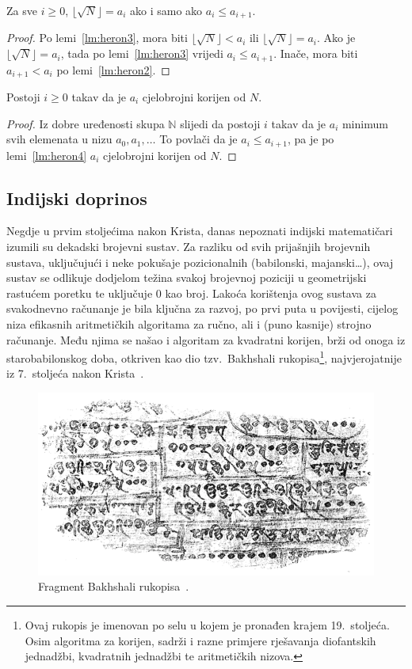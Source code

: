\documentclass[12pt]{scrartcl}
\begin{document}
\begin{lema}\label{lm:heron4}
    Za sve $i\geq 0$, $\lfloor\sqrt{N}\rfloor=a_i$ ako i samo ako $a_i \leq a_{i+1}$.
\end{lema}
\begin{proof}
    Po lemi~\ref{lm:heron3}, mora biti $\lfloor\sqrt{N}\rfloor < a_i$ ili $\lfloor\sqrt{N}\rfloor = a_i$. Ako je $\lfloor\sqrt{N}\rfloor = a_i$,
    tada po lemi~\ref{lm:heron3} vrijedi $a_i \leq a_{i+1}$. Inače, mora biti $a_{i+1} < a_i$ po lemi~\ref{lm:heron2}.
\end{proof}
\begin{teorem}\label{tm:heron}
    Postoji $i\geq0$ takav da je $a_i$ cjelobrojni korijen od $N$.
\end{teorem}
\begin{proof}
    Iz dobre uređenosti skupa $\mathbb N$ slijedi da postoji $i$ takav da je $a_i$ minimum svih elemenata u nizu $a_0,a_1,\dotsc$
    To povlači da je $a_i \leq a_{i+1}$, pa je po lemi~\ref{lm:heron4} $a_i$ cjelobrojni korijen od $N$.
\end{proof}

\subsection{Indijski doprinos}
Negdje u prvim stoljećima nakon Krista, danas nepoznati indijski matematičari izumili su dekadski brojevni sustav. Za razliku od svih prijašnjih brojevnih sustava,
uključujući i neke pokušaje pozicionalnih (babilonski, majanski\ldots), ovaj sustav se odlikuje dodjelom težina svakoj brojevnoj poziciji u geometrijski
rastućem poretku te uključuje $0$ kao broj. Lakoća korištenja ovog sustava za svakodnevno računanje je bila ključna za razvoj, po prvi puta
u povijesti, cijelog niza
efikasnih aritmetičkih algoritama za ručno, ali i (puno kasnije) strojno računanje. Među njima se našao i algoritam za kvadratni korijen, brži od onoga
iz starobabilonskog doba, otkriven kao dio tzv.\ Bakhshali rukopisa\footnote{Ovaj rukopis je imenovan po selu u kojem je pronađen krajem 19.\ stoljeća.
Osim algoritma za korijen, sadrži i razne primjere rješavanja diofantskih jednadžbi, kvadratnih jednadžbi te aritmetičkih nizova.},
najvjerojatnije iz 7.\ stoljeća nakon Krista~\cite{bakhshali}.

\begin{figure}
    \caption{Fragment Bakhshali rukopisa~\cite{bakhshali}.}
    \center
    \includegraphics[scale=0.5]{bakhshali}
\end{figure}
\end{document}
